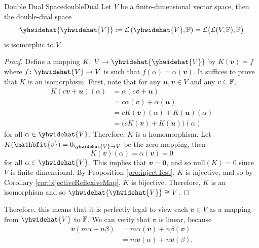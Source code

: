 \documentclass[math, code]{amznotes}
\theoremstyle{remark}
\newcommand{\zero}{\mathbf{0}}
\begin{document}
\begin{probox}{Double Dual Space}{doubleDual}
    Let $V$ be a finite-dimensional vector space, then the double-dual space 
    \begin{equation*}
        \yhwidehat{\yhwidehat{V}} \coloneqq \mathcal{L}\left(\yhwidehat{V}, \F\right) = \mathcal{L}\bigl(\mathcal{L}(V, \F), \F\bigr)
    \end{equation*}
    is isomorphic to $V$.
    \tcblower
    \begin{proof}
        Define a mapping $K \colon V \to \yhwidehat{\yhwidehat{V}}$ by $K(\mathbfit{v}) = f$ where $f \colon \yhwidehat{V} \to V$ is such that $f(\alpha) = \alpha(\mathbfit{v})$. It suffices to prove that $K$ is an isomorphism. First, note that for any $\mathbfit{u}, \mathbfit{v} \in V$ and any $c \in \mathbb{F}$,
        \begin{align*}
            K(c\mathbfit{v} + \mathbfit{u})(\alpha) & = \alpha(c\mathbfit{v} + \mathbfit{u}) \\
            & = c\alpha(\mathbfit{v}) + \alpha(\mathbfit{u}) \\
            & = cK(\mathbfit{v})(\alpha) + K(\mathbfit{u})(\alpha) \\
            & = \bigl(cK(\mathbfit{v}) + K(\mathbfit{u})\bigr)(\alpha)
        \end{align*}
        for all $\alpha \in \yhwidehat{V}$. Therefore, $K$ is a homomorphism. Let $K(\mathbfit{v}) = 0_{\yhwidehat{V} \to V}$ be the zero mapping, then 
        \begin{equation*}
            K(\mathbfit{v})(\alpha) = \alpha(\mathbfit{v}) = 0
        \end{equation*}
        for all $\alpha \in \yhwidehat{V}$. This implies that $\mathbfit{v} = \zero$, and so $\mathrm{null}(K) = 0$ since $V$ is finite-dimensional. By Proposition \ref{pro:injectTest}, $K$ is injective, and so by Corollary \ref{cor:bijectiveReflexiveMap}, $K$ is bijective. Therefore, $K$ is an isomorphism and so $\yhwidehat{\yhwidehat{V}} \cong V$.
    \end{proof}
\end{probox}
Therefore, this means that it is perfectly legal to view each $\mathbfit{v} \in V$ as a mapping from $\yhwidehat{V}$ to $\mathbb{F}$. We can verify that $\mathbfit{v}$ is linear, because
\begin{align*}
    \mathbfit{v}(m\alpha + n\beta) & = m\alpha(\mathbfit{v}) + n\beta(\mathbfit{v}) \\
    & = m\mathbfit{v}(\alpha) + n\mathbfit{v}(\beta).
\end{align*}
\end{document}
